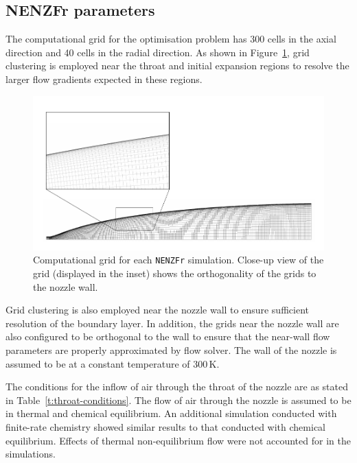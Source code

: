 \documentclass[12pt,a4paper]{article}
\begin{document}
\subsection{NENZFr parameters}
\label{sec:nozzle-design:NENZFr-parameters}
%
The computational grid for the optimisation problem has 300 cells in the 
axial direction and 40 cells in the radial direction. As shown in 
Figure~\ref{f:NENZFr-grid}, grid clustering is employed near the throat and 
initial expansion regions to resolve the larger flow gradients expected in 
these regions. 
%
\begin{figure}[htbp]
 \begin{center}
  \includegraphics[width=16cm]{figs/nozzle-optimisation-grid.pdf}
  \caption{Computational grid for each \texttt{NENZFr} simulation. Close-up 
           view of the grid (displayed in the inset) shows the orthogonality 
           of the grids to the nozzle wall.}
  \label{f:NENZFr-grid}
 \end{center}
\end{figure}
%
Grid clustering is also employed near the nozzle wall to ensure sufficient 
resolution of the boundary layer. In addition, the grids near the nozzle wall 
are also configured to be orthogonal to the wall to ensure that the near-wall
flow parameters are properly approximated by flow solver. The wall of the
nozzle is assumed to be at a constant temperature of 300\,K. 

The conditions for the inflow of air through the throat of the nozzle are as 
stated in Table~\ref{t:throat-conditions}. The flow of air through the nozzle 
is assumed to be in thermal and chemical equilibrium. An additional simulation 
conducted with finite-rate chemistry showed similar results to that conducted 
with chemical equilibrium. Effects of thermal non-equilibrium flow were not 
accounted for in the simulations.
\end{document}
